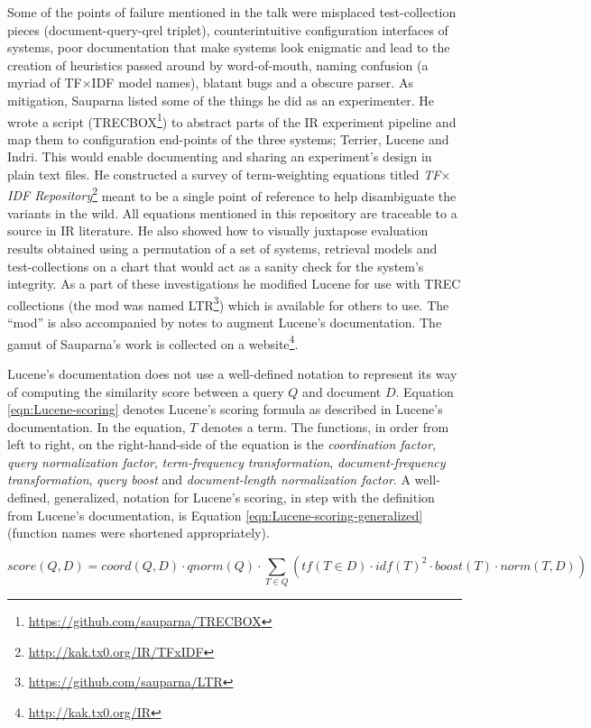 Some of the points of failure mentioned in the talk were misplaced
test-collection pieces (document-query-qrel triplet), counterintuitive
configuration interfaces of systems, poor documentation that make
systems look enigmatic and lead to the creation of heuristics passed
around by word-of-mouth, naming confusion (a myriad of TF$\times$IDF
model names), blatant bugs and a obscure parser. As mitigation,
Sauparna listed some of the things he did as an experimenter. He wrote
a script (TRECBOX\footnote{\url{https://github.com/sauparna/TRECBOX}})
to abstract parts of the IR experiment pipeline and map them to
configuration end-points of the three systems; Terrier, Lucene and
Indri. This would enable documenting and sharing an experiment's
design in plain text files. He constructed a survey of term-weighting
equations titled \emph{TF$\times$IDF
  Repository}\footnote{\url{http://kak.tx0.org/IR/TFxIDF}} meant to be
a single point of reference to help disambiguate the variants in the
wild. All equations mentioned in this repository are traceable to a
source in IR literature. He also showed how to visually juxtapose
evaluation results obtained using a permutation of a set of systems,
retrieval models and test-collections on a chart that would act as a
sanity check for the system's integrity. As a part of these
investigations he modified Lucene for use with TREC collections (the
mod was named LTR\footnote{\url{https://github.com/sauparna/LTR}})
which is available for others to use. The ``mod'' is also accompanied
by notes to augment Lucene's documentation. The gamut of Sauparna's
work is collected on a website\footnote{\url{http://kak.tx0.org/IR}}.

Lucene's documentation does not use a well-defined notation to
represent its way of computing the similarity score between a query
$Q$ and document $D$. Equation \eqref{eqn:Lucene-scoring} denotes
Lucene's scoring formula as described in Lucene's documentation. In
the equation, $T$ denotes a term. The functions, in order from left to
right, on the right-hand-side of the equation is the
\emph{coordination factor}, \emph{query normalization factor},
\emph{term-frequency transformation}, \emph{document-frequency
  transformation}, \emph{query boost} and \emph{document-length
  normalization factor}. A well-defined, generalized, notation for
Lucene's scoring, in step with the definition from Lucene's
documentation, is Equation \eqref{eqn:Lucene-scoring-generalized}
(function names were shortened appropriately).

\begin{equation}
  score(Q,D) = coord(Q,D) \cdot qnorm(Q) \cdot \displaystyle\sum_{T \in Q} (tf(T \in D) \cdot idf(T)^2 \cdot boost(T) \cdot norm(T,D))
  \label{eqn:Lucene-scoring}
\end{equation}

